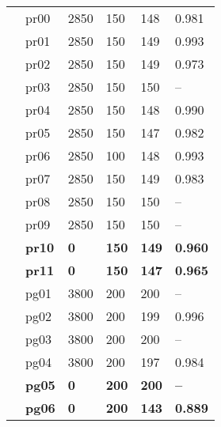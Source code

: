 \begin{table}[t]
{\begin{tabular}{C{0.7cm}C{2cm}C{1.5cm}C{1.6cm}C{1.5cm}C{1.5cm}}
    & pr00   & 2850 & 150    & 148  & 0.981   \\  
    & pr01   & 2850 & 150    & 149  & 0.993   \\  
    & pr02   & 2850 & 150    & 149   & 0.973      \\  
    & pr03   & 2850 & 150    & 150   & --      \\  
    & pr04   & 2850 & 150    & 148   & 0.990      \\  
    & pr05   & 2850 & 150    & 147  & 0.982   \\  
    & pr06   & 2850 & 100    & 148   & 0.993     \\      
    & pr07   & 2850 & 150    & 149   & 0.983      \\  
    & pr08   & 2850 & 150    & 150   & --      \\  
    & pr09   & 2850 & 150    & 150   & --      \\  
    & \textbf{pr10}   & \textbf{0}    & \textbf{150}     & \textbf{149}   & \textbf{0.960}   \\  
    & \textbf{pr11}   & \textbf{0}    & \textbf{150}     & \textbf{147}   & \textbf{0.965}      \\ \hline
{} 
    & pg01   & 3800 & 200    & 200  & --      \\  
    & pg02   & 3800 & 200    & 199  & 0.996      \\  
    & pg03   & 3800 & 200    & 200  & --      \\  
    & pg04   & 3800 & 200    & 197  & 0.984      \\  
    & \textbf{pg05}   & \textbf{0}    & \textbf{200}     & \textbf{200}   & \textbf{--}      \\  
    & \textbf{pg06}   & \textbf{0}    & \textbf{200}     & \textbf{143}   & \textbf{0.889}      \\ \hline
\end{tabular}
}
\vspace{-5mm}
\end{table}